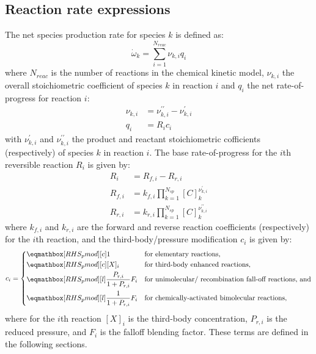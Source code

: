 \documentclass[12pt]{article}
\newcommand{\ns}{N_{sp}}
\newcommand{\nr}{N_{reac}}
\begin{document}
\subsection{Reaction rate expressions}
The net species production rate for species $k$ is defined as:
\begin{equation}
 \label{e:spec_rop}
 \dot{\omega}_{k} = \sum_{i=1}^{\nr} \nu_{k,i} q_{i}
\end{equation}
where $\nr$ is the number of reactions in the chemical kinetic model, $\nu_{k, i}$ the overall stoichiometric coefficient of species $k$ in reaction $i$ and $q_i$ the net rate-of-progress for reaction $i$:
\begin{align}
\nu_{k,i} &= \nu^{\prime\prime}_{k,i} - \nu^{\prime}_{k,i} \\
q_{i} &= R_{i} c_{i}
\end{align}
with $\nu^{\prime}_{k,i}$ and $\nu^{\prime\prime}_{k,i}$ the product and reactant stoichiometric cofficients (respectively) of species $k$ in reaction $i$.
The base rate-of-progress for the $i$th reversible reaction $R_{i}$ is given by:
\begin{align}
R_{i} &= {R_{f,i}} - {R_{r,i}} \label{e:ropnet}\\
{R_{f, i}} &= {k_{f, i}} \prod_{k=1}^{\ns} [C]_{k}^{\nu^{\prime}_{k,i}} \label{e:ropf}\\
{R_{r, i}} &= {k_{r, i}} \prod_{k=1}^{\ns} [C]_{k}^{\nu^{\prime\prime}_{k,i}} \label{e:ropr}
\end{align}
where ${k_{f, i}}$ and ${k_{r, i}}$ are the forward and reverse reaction coefficients (respectively) for the $i$th reaction, and the third-body\slash pressure modification $c_{i}$ is given by:
\begin{equation}
\label{e:rxn_pressure}
c_i = \begin{dcases}
  \rhs{pmod}{1}[c] &\text{for elementary reactions,} \\
  \rhs{pmod}{[X]_i}[c] &\text{for third-body enhanced reactions,} \\
  \rhs{pmod}{\frac{P_{r,i}}{1 + P_{r,i}} F_i} &\text{for unimolecular\slash~recombination fall-off reactions, and} \\
  \rhs{pmod}{\frac{1}{1 + P_{r,i}} F_i} &\text{for chemically-activated bimolecular reactions,}
  \end{dcases}
\end{equation}
where for the $i$th reaction $[X]_i$ is the third-body concentration, $P_{r,i}$ is the reduced pressure, and $F_i$ is the falloff blending factor.
These terms are defined in the following sections.
\end{document}
